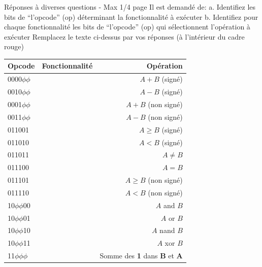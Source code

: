 \documentclass[a4paper]{article}
\begin{document}
	
\begin{tcolorbox}[colframe=Monokaimagenta,colback=white]
Réponses à diverses questions - Max 1/4 page 
Il est demandé de: 
a. Identifiez les bits de “l’opcode” (op) déterminant la fonctionnalité à exécuter
b. Identifiez pour chaque fonctionnalité les bits de “l’opcode” (op) qui sélectionnent l’opération à exécuter
Remplacez le texte ci-dessus par vos réponses (à l’intérieur du cadre rouge)\\
\begin{center}
    
\begin{tabular}{ l | c |r }
    \hline
    Opcode           &  Fonctionnalité & Opération\\
    \hline
    0000$\phi\phi$   &     \nameref{add_Sub}    & $A+B$ (signé) \\
    0010$\phi\phi$   &                 & $A-B$ (signé) \\
    0001$\phi\phi$   &                 & $A+B$ (non signé) \\
    0011$\phi\phi$   &                 & $A-B$ (non signé) \\
    \hline
    011001           &  \nameref{comp} & $A \ge B$ (signé) \\
    011010           &                 & $A < B$ (signé) \\
    011011           &                 & $A \ne B$\\
    011100           &                 & $A = B$ \\
    011101           &                 & $A \ge B$ (non signé) \\
    011110           &                 & $A < B$ (non signé) \\
    \hline
    10$\phi\phi$00   &\nameref{logique}& $A$ and $B$\\
    10$\phi\phi$01   &                 & $A$ or $B$\\
    10$\phi\phi$10   &                 & $A$ nand $B$\\
    10$\phi\phi$11   &                 & $A$ xor $B$\\
    \hline
    11$\phi\phi\phi$ & \nameref{custom}& Somme des \textbf{1} dans \textbf{B} et \textbf{A}
     
\end{tabular}

\end{center}

\end{tcolorbox}
\end{document}
